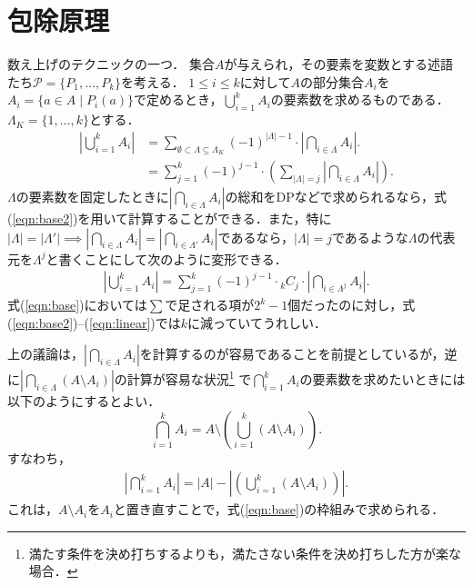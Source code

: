 \documentclass{jsarticle}
\begin{document}
\section{包除原理}

数え上げのテクニックの一つ．
集合$A$が与えられ，その要素を変数とする述語たち$\mathcal{P}=\{P_1, \dots, P_k\}$を考える．
$1\le i\le k$に対して$A$の部分集合$A_i$を$A_i=\{a\in A\mid P_i(a)\}$で定めるとき，$\bigcup_{i=1}^k A_i$の要素数を求めるものである．
$\Lambda_K=\{1, \dots, k\}$とする．
\begin{align}\label{eqn:base}
\left|\bigcup_{i=1}^k A_i\right|
&= \sum_{\emptyset\subset\Lambda\subseteq \Lambda_K} (-1)^{|\Lambda|-1}\cdot \left|\bigcap_{i\in\Lambda} A_i\right|.\\
\label{eqn:base2}
&= \sum_{j=1}^k (-1)^{j-1}\cdot \left(\sum_{|\Lambda|=j} \left|\bigcap_{i\in\Lambda} A_i\right|\right).
\end{align}
$\Lambda$の要素数を固定したときに$\left|\bigcap_{i\in\Lambda} A_i\right|$の総和をDPなどで求められるなら，式(\ref{eqn:base2})を用いて計算することができる．また，特に
$|\Lambda|=|\Lambda'|\implies\left|\bigcap_{i\in\Lambda}A_i\right| = \left|\bigcap_{i\in\Lambda'}A_i\right|$であるなら，$|\Lambda|=j$であるような$\Lambda$の代表元を$\Lambda^j$と書くことにして次のように変形できる．
\begin{align}\label{eqn:linear}
  \left|\bigcup_{i=1}^k A_i\right|
  = \sum_{j=1}^k (-1)^{j-1}\cdot {}_k C_j\cdot\left|\bigcap_{i\in\Lambda^j}A_i\right|.
\end{align}
式(\ref{eqn:base})においては$\sum$で足される項が$2^k-1$個だったのに対し，式(\ref{eqn:base2})--(\ref{eqn:linear})では$k$に減っていてうれしい．

上の議論は，$\left|\bigcap_{i\in\Lambda}A_i\right|$を計算するのが容易であることを前提としているが，逆に$\left|\bigcap_{i\in\Lambda}(A\setminus A_i)\right|$の計算が容易な状況\footnote{満たす条件を決め打ちするよりも，満たさない条件を決め打ちした方が楽な場合．}
で$\bigcap_{i=1}^k A_i$の要素数を求めたいときには以下のようにするとよい．
\[
\bigcap_{i=1}^k A_i = A\setminus\left(\bigcup_{i=1}^k (A\setminus A_i)\right).
\]
すなわち，
\begin{align}\label{eqn:cmpl}
\left|\bigcap_{i=1}^k A_i\right| = |A|-\left|\left(\bigcup_{i=1}^k (A\setminus A_i)\right)\right|.
\end{align}
これは，$A\setminus A_i$を$A_i$と置き直すことで，式(\ref{eqn:base})の枠組みで求められる．
\end{document}
